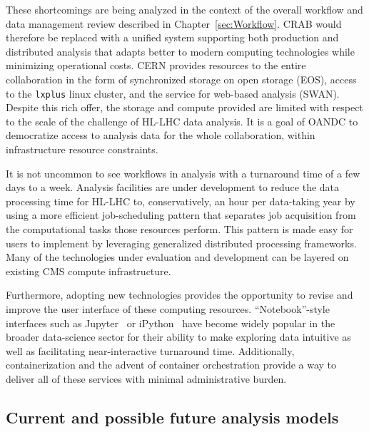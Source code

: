 These shortcomings are being analyzed in the context of the overall workflow and data management review described in Chapter~\ref{sec:Workflow}. 
CRAB would therefore be replaced
with a unified system supporting both production and distributed analysis that adapts better to modern computing technologies while minimizing operational costs. 
CERN provides resources to the entire collaboration in the form of synchronized storage on open storage (EOS), access to the \texttt{lxplus} linux cluster, and the service for web-based analysis (SWAN). Despite this rich offer, the storage and compute provided are limited with respect to the scale of the challenge of HL-LHC data analysis.
It is a goal of \gls{OANDC} to democratize access to analysis data for the whole collaboration, within infrastructure resource constraints.

It is not uncommon to see workflows in \RunThree analysis with a turnaround time of a few days to a week. Analysis facilities are under development to reduce the data processing time for \gls{HL-LHC} to, conservatively, an hour per data-taking year by using a more efficient job-scheduling pattern that separates job acquisition from the computational tasks those resources perform. This pattern is made easy for users to implement by leveraging generalized distributed processing frameworks. Many of the technologies under evaluation and development can be layered on existing CMS compute infrastructure.

Furthermore, adopting new technologies provides the opportunity to revise and improve the user interface of these computing resources. ``Notebook''-style interfaces such as Jupyter~\cite{jupyterhub} or iPython~\cite{ipython} have become widely popular in the broader data-science sector for their ability to make exploring data intuitive as well as facilitating near-interactive turnaround time. 
Additionally, containerization and the advent of container orchestration provide a way to deliver all of these services with minimal administrative burden. 

\subsection{Current and possible future analysis models}

